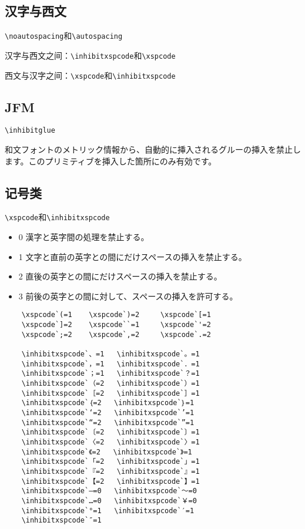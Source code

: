 \documentclass{zh-article}
\begin{document}
\subsection{汉字与西文}
\verb!\noautospacing!和\verb!\autospacing!

汉字与西文之间：\verb!\inhibitxspcode!和\verb!\xspcode!

西文与汉字之间：\verb!\xspcode!和\verb!\inhibitxspcode!
\subsection{JFM}
\verb!\inhibitglue!

和文フォントのメトリック情報から、自動的に挿入されるグルーの挿入を禁止します。このプリミティブを挿入した箇所にのみ有効です。 
\subsection{记号类}
\verb!\xspcode!和\verb!\inhibitxspcode!

\begin{itemize}
\item   0  漢字と英字間の処理を禁止する。
\item   1  文字と直前の英字との間にだけスペースの挿入を禁止する。
\item   2  直後の英字との間にだけスペースの挿入を禁止する。
\item   3  前後の英字との間に対して、スペースの挿入を許可する。
\end{itemize}
\begin{verbatim}
    \xspcode`(=1    \xspcode`)=2     \xspcode`[=1
    \xspcode`]=2    \xspcode``=1     \xspcode`'=2
    \xspcode`;=2    \xspcode`,=2     \xspcode`.=2

    \inhibitxspcode`、=1   \inhibitxspcode`。=1
    \inhibitxspcode`，=1   \inhibitxspcode`．=1
    \inhibitxspcode`；=1   \inhibitxspcode`？=1
    \inhibitxspcode`（=2   \inhibitxspcode`）=1
    \inhibitxspcode`［=2   \inhibitxspcode`］=1
    \inhibitxspcode`｛=2   \inhibitxspcode`｝=1
    \inhibitxspcode`‘=2   \inhibitxspcode`’=1
    \inhibitxspcode`“=2   \inhibitxspcode`”=1
    \inhibitxspcode`〔=2   \inhibitxspcode`〕=1
    \inhibitxspcode`〈=2   \inhibitxspcode`〉=1
    \inhibitxspcode`《=2   \inhibitxspcode`》=1
    \inhibitxspcode`「=2   \inhibitxspcode`」=1
    \inhibitxspcode`『=2   \inhibitxspcode`』=1
    \inhibitxspcode`【=2   \inhibitxspcode`】=1
    \inhibitxspcode`―=0   \inhibitxspcode`～=0
    \inhibitxspcode`…=0   \inhibitxspcode`￥=0
    \inhibitxspcode`°=1   \inhibitxspcode`′=1
    \inhibitxspcode`″=1
\end{verbatim}
\end{document}
